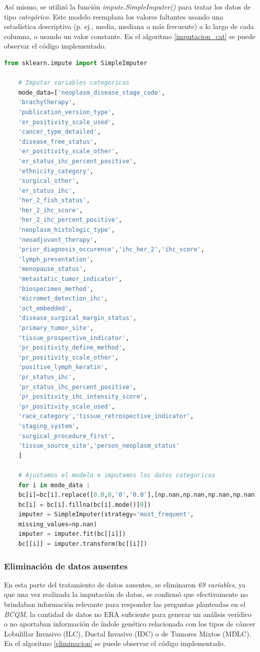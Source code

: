 Así mismo, se utilizó la función \textit{impute.SimpleImputer()} para tratar los datos de tipo \textit{categórico}. Este modelo reemplaza los valores faltantes usando una estadística descriptiva (p. ej., media, mediana o más frecuente) a lo largo de cada columna, o usando un valor constante. En el algoritmo \ref{imputacion_cat} se puede observar el código implementado.

\begin{lstlisting}[basicstyle=\scriptsize,language=Python, label=imputacion_cat, caption=Imputar datos categóricos con sklearn en Python.]
	from sklearn.impute import SimpleImputer
	
	# Imputar variables categoricas
	mode_data=['neoplasm_disease_stage_code',
	'brachytherapy',
	'publication_version_type',
	'er_positivity_scale_used',
	'cancer_type_detailed',
	'disease_free_status',
	'er_positivity_scale_other',
	'er_status_ihc_percent_positive',
	'ethnicity_category',
	'surgical_other',
	'er_status_ihc',
	'her_2_fish_status',
	'her_2_ihc_score',
	'her_2_ihc_percent_positive',
	'neoplasm_histologic_type',
	'neoadjuvant_therapy',
	'prior_diagnosis_occurence','ihc_her_2','ihc_score',
	'lymph_presentation',
	'menopause_status',
	'metastatic_tumor_indicator',
	'biospecimen_method',
	'micromet_detection_ihc',
	'oct_embedded',
	'disease_surgical_margin_status',
	'primary_tumor_site',
	'tissue_prospective_indicator',
	'pr_positivity_define_method',
	'pr_positivity_scale_other',
	'positive_lymph_keratin',
	'pr_status_ihc',
	'pr_status_ihc_percent_positive',
	'pr_positivity_ihc_intensity_score',
	'pr_positivity_scale_used',
	'race_category','tissue_retrospective_indicator',
	'staging_system',
	'surgical_procedure_first',
	'tissue_source_site','person_neoplasm_status'
	]
	
	# Ajustamos el modelo e imputamos los datos categoricos
	for i in mode_data :
	bc[i]=bc[i].replace([0.0,0,'0','0.0'],[np.nan,np.nan,np.nan,np.nan])
	bc[i] = bc[i].fillna(bc[i].mode()[0])
	imputer = SimpleImputer(strategy='most_frequent', 
	missing_values=np.nan)
	imputer = imputer.fit(bc[[i]])
	bc[[i]] = imputer.transform(bc[[i]])
\end{lstlisting}


\subsubsection{Eliminación de datos ausentes}

En esta parte del tratamiento de datos ausentes, se eliminaron \textit{69 variables}, ya que una vez realizada la imputación de datos, se confirmó que efectivamente no brindaban información relevante para responder las preguntas planteadas en el \textit{BCQM}, la cantidad de datos no ERA suficiente para generar un análisis verídico o  no aportaban información de índole genético relacionada con los tipos de cáncer Lobulillar Invasivo (ILC), Ductal Invasivo (IDC) o de Tumores Mixtos (MDLC). En el algoritmo \ref{eliminacion} se puede observar el código implementado.

